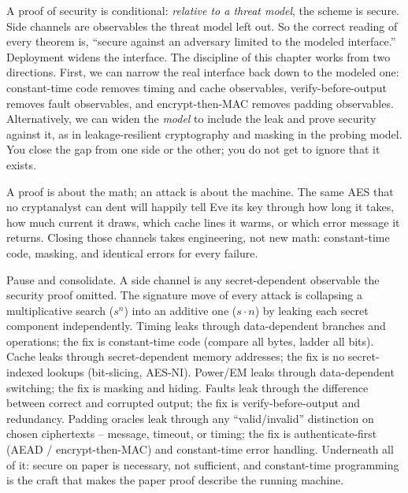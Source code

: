 \begin{focusbox}
A proof of security is conditional: \emph{relative to a threat model}, the scheme is secure. Side channels are observables the threat model left out. So the correct reading of every theorem is, ``secure against an adversary limited to the modeled interface.'' Deployment widens the interface. The discipline of this chapter works from two directions. First, we can narrow the real interface back down to the modeled one: constant-time code removes timing and cache observables, verify-before-output removes fault observables, and encrypt-then-MAC removes padding observables. Alternatively, we can widen the \emph{model} to include the leak and prove security against it, as in leakage-resilient cryptography and masking in the probing model. You close the gap from one side or the other; you do not get to ignore that it exists.
\end{focusbox}

\begin{intuitionbox}
A proof is about the math; an attack is about the machine. The same AES that no cryptanalyst can dent will happily tell Eve its key through how long it takes, how much current it draws, which cache lines it warms, or which error message it returns. Closing those channels takes engineering, not new math: constant-time code, masking, and identical errors for every failure.
\end{intuitionbox}

\begin{recoverybox}
Pause and consolidate. A side channel is any secret-dependent observable the security proof omitted. The signature move of every attack is collapsing a multiplicative search ($s^{n}$) into an additive one ($s\cdot n$) by leaking each secret component independently. Timing leaks through data-dependent branches and operations; the fix is constant-time code (compare all bytes, ladder all bits). Cache leaks through secret-dependent memory addresses; the fix is no secret-indexed lookups (bit-slicing, AES-NI). Power/EM leaks through data-dependent switching; the fix is masking and hiding. Faults leak through the difference between correct and corrupted output; the fix is verify-before-output and redundancy. Padding oracles leak through any ``valid/invalid'' distinction on chosen ciphertexts -- message, timeout, or timing; the fix is authenticate-first (AEAD / encrypt-then-MAC) and constant-time error handling. Underneath all of it: secure on paper is necessary, not sufficient, and constant-time programming is the craft that makes the paper proof describe the running machine.
\end{recoverybox}

